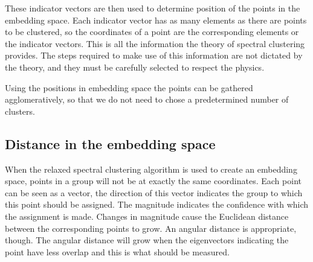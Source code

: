 These indicator vectors are then used to determine position of the points in the embedding space.
Each indicator vector has as many elements as there are points to be clustered,
so the coordinates of a point are the corresponding elements or the indicator vectors.
This is all the information the theory of spectral clustering provides.
The steps required to make use of this information are not dictated by the theory,
and they must be carefully selected to respect the physics.

Using the positions in embedding space the points can be gathered agglomeratively,
so that we do not need to chose a predetermined number of clusters.

\subsection{Distance in the embedding space}\label{sec:embedding_distance}
%
When the relaxed spectral clustering algorithm is used to create an embedding space, points in a group will not be at exactly the same coordinates.
Each point can be seen as a vector, the direction of this vector indicates the group to which this point should be assigned.
The magnitude indicates the confidence with which the assignment is made.
Changes in magnitude cause the Euclidean distance between the corresponding points to grow.
An angular distance is appropriate, though. 
The angular distance will grow when the eigenvectors indicating the point have less overlap
and this is what should be measured.

